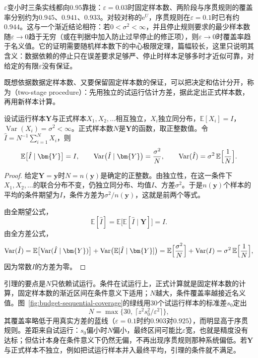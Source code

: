 $\varepsilon$变小时三条实线都向$0.95$靠拢：$\varepsilon=0.03$时固定样本数、两阶段与序贯规则的覆盖率分别约为$0.945$、$0.941$、$0.933$。对较对称的$\mathrm{e}^{U}$，序贯规则在$\varepsilon=0.1$时已有约$0.944$。这与一个渐近结论相符：若$0<\sigma^{2}<\infty$，并且停止规则要求的最少样本数随$\varepsilon\to0$趋于无穷（或在判据中加入防止过早停止的修正项），则$\varepsilon\to0$时覆盖率趋于名义值。它的证明需要随机样本数下的中心极限定理，篇幅较长，这里只说明其含义：数据依赖的停止只在误差要求足够严、停止时样本足够多时才近似可靠，对给定的有限$\varepsilon$没有保证。

既想依据数据定样本数、又要保留固定样本数的保证，可以把决定和估计分开，称为（two-stage procedure）：先用独立的试运行估计方差，据此定出正式样本数，再用新样本计算。

\begin{lemma}
\label{lem:budget-two-stage}
设试运行样本$\bm{Y}$与正式样本$X_1,X_2,\dots$相互独立，$X_i$独立同分布，$\mathbb{E}[X_i]=I$，$\operatorname{Var}(X_i)=\sigma^{2}<\infty$。正式样本数$N$是$\bm{Y}$的函数，取正整数值。令$\hat{I}=N^{-1}\sum_{i=1}^{N}X_i$，则
\begin{equation}
  \mathbb{E}\bigl[\hat{I}\mid\bm{Y}\bigr]=I,\qquad\operatorname{Var}\bigl(\hat{I}\mid\bm{Y}\bigr)=\frac{\sigma^{2}}{N},\qquad\operatorname{Var}(\hat{I})=\sigma^{2}\,\mathbb{E}\Bigl[\frac1N\Bigr].
  \label{eq:budget-two-stage}
\end{equation}
\end{lemma}

\begin{proof}
给定$\bm{Y}=\bm{y}$时$N=n(\bm{y})$是确定的正整数。由独立性，在这一条件下$X_1,X_2,\dots$的联合分布不变，仍独立同分布、均值$I$、方差$\sigma^{2}$。于是$n(\bm{y})$个样本的平均的条件期望为$I$，条件方差为$\sigma^{2}/n(\bm{y})$，这就是前两个等式。

由全期望公式，
\[
  \mathbb{E}[\hat{I}]=\mathbb{E}\bigl[\mathbb{E}[\hat{I}\mid\bm{Y}]\bigr]=I .
\]
由全方差公式，
\[
  \operatorname{Var}(\hat{I})=\mathbb{E}\bigl[\operatorname{Var}(\hat{I}\mid\bm{Y})\bigr]+\operatorname{Var}\bigl(\mathbb{E}[\hat{I}\mid\bm{Y}]\bigr)=\mathbb{E}\Bigl[\frac{\sigma^{2}}{N}\Bigr]+\operatorname{Var}(I)=\sigma^{2}\,\mathbb{E}\Bigl[\frac1N\Bigr],
\]
因为常数$I$的方差为零。
\end{proof}

引理的要点是$N$只依赖试运行。条件在试运行上，正式计算就是固定样本数的计算，固定样本数的渐近区间在条件意义下适用；$N$越大，条件覆盖率越接近名义值。图~\ref{fig:budget-sequential-coverage}的绿线用$30$个试运行样本的标准差$s_{0}$定出
\[
  N=\max\bigl\{30,\ \lceil z^{2}s_{0}^{2}/\varepsilon^{2}\rceil\bigr\},
\]
其覆盖率略低于用真实方差的蓝线（$\varepsilon=0.1$时约$0.903$对$0.925$），而明显高于序贯规则。差距来自试运行：$s_{0}$偏小时$N$偏小，最终区间可能比$\varepsilon$宽，也就是精度没有达标；但估计本身在条件意义下仍然无偏，不再出现序贯规则那种系统偏低。若$\bm{Y}$与正式样本不独立，例如把试运行样本并入最终平均，引理的条件就不满足。

